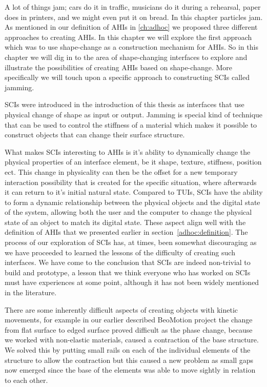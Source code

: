 

A lot of things jam; cars do it in traffic, musicians do it during a rehearsal, paper does in printers, and we might even put it on bread.
In this chapter particles jam.
\blank
As mentioned in our definition of AHIs in \autoref{ch:adhoc} we proposed three different approaches to creating AHIs.
In this chapter we will explore the first approach which was to use shape-change as a construction mechanism for AHIs.
So in this chapter we will dig in to the area of shape-changing interfaces to explore and illustrate the possibilities of creating AHIs based on shape-change.
More specifically we will touch upon a specific approach to constructing SCIs called jamming.

SCIs were introduced in the introduction of this thesis as interfaces that use physical change of shape as input or output.
Jamming is special kind of technique that can be used to control the stiffness of a material which makes it possible to construct objects that can change their surface structure.

What makes SCIs interesting to AHIs is it's ability to dynamically change the physical properties of an interface element, be it shape, texture, stiffness, position ect.
This change in physicality can then be the offset for a new temporary interaction possibility that is created for the specific situation, where afterwards it can return to it's initial natural state.
Compared to TUIs, SCIs have the ability to form a dynamic relationship between the physical objects and the digital state of the system, allowing both the user and the computer to change the physical state of an object to match its digital state.
These aspect align well with the definition of AHIs that we presented earlier in section~\ref{adhoc:definition}.
\blank
The process of our exploration of SCIs has, at times, been somewhat discouraging as we have proceeded to learned the lessons of the difficulty of creating such interfaces.
We have come to the conclusion that SCIs are indeed non-trivial to build and prototype, a lesson that we think everyone who has worked on SCIs must have experiences at some point, although it has not been widely mentioned in the literature. 

There are some inherently difficult aspects of creating objects with kinetic movements, for example in our earlier described BeoMotion project the change from flat surface to edged surface proved difficult as the phase change, because we worked with non-elastic materials, caused a contraction of the base structure.
We solved this by putting small rails on each of the individual elements of the structure to allow the contraction but this caused a new problem as small gaps now emerged since the base of the elements was able to move sightly in relation to each other.


